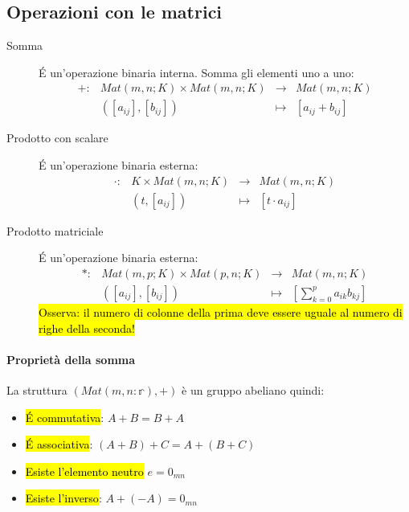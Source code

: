 \subsection{Operazioni con le matrici}
\begin{description}
    \item[Somma] \'E un'operazione binaria interna. Somma gli elementi uno a uno:
        \[
            \begin{array}{cccc}
                +: & Mat(m,n;K) \times Mat(m,n;K) & \to &Mat(m,n;K) \\
                & ([a_{ij}], [b_{ij}]) &\mapsto  & [a_{ij} + b_{ij}]
            \end{array}
        \]
    \item[Prodotto con scalare] \'E un'operazione binaria esterna:
        \[
            \begin{array}{cccc}
                \cdot: & K \times Mat(m,n;K) & \to &Mat(m,n;K) \\
                & (t, [a_{ij}]) &\mapsto  & [t \cdot a_{ij}]
            \end{array}
        \]
    \item[Prodotto matriciale] \'E un'operazione binaria esterna:
        \[
            \begin{array}{cccc}
                \ast: & Mat(m,p;K) \times Mat(p,n;K) & \to &Mat(m,n;K) \\
                & ([a_{ij}], [b_{ij}]) &\mapsto  & [\sum_{k=0}^p a_{ik}b_{kj}]
            \end{array}
        \]
        \hl{Osserva: il numero di colonne della prima deve essere uguale al numero
            di righe della seconda!}
\end{description}

\paragraph{Proprietà della somma} La struttura $(Mat(m,n:\mathbb{r}), +)$ è un
gruppo abeliano quindi:
\begin{itemize}
    \item \hl{\'E commutativa}: $A + B = B + A$
    \item \hl{\'E associativa}: $(A + B) + C = A + (B + C)$
    \item \hl{Esiste l'elemento neutro} $e = 0_{mn}$
    \item \hl{Esiste l'inverso}: $A + (-A) = 0_{mn}$
\end{itemize}

